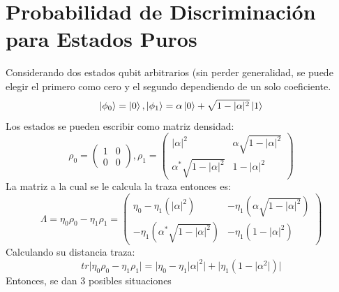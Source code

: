 \documentclass{book}
\begin{document}
\section{{Probabilidad de Discriminación para Estados Puros}}
Considerando dos estados qubit arbitrarios (sin perder generalidad, se puede elegir el primero como cero y el segundo dependiendo de un solo coeficiente.
\begin{equation} {\ket{\phi_0}=\ket{0}, \ket{\phi_1}=\alpha\ket{0}+\sqrt{1-\lvert\alpha\rvert^2}\ket{1} } \end{equation}
Los estados se pueden escribir como matriz densidad:
\begin{equation}{\rho_0=\begin{pmatrix} 1&0\\0&0\end{pmatrix}, \rho_1=\begin{pmatrix}\lvert\alpha\rvert^2&\alpha\sqrt{1-\lvert\alpha\rvert^2}\\ \alpha^*\sqrt{1-\lvert\alpha\rvert^2}&1-\lvert\alpha\rvert^2\end{pmatrix} }\end{equation}
La matriz a la cual se le calcula la traza entonces es:
\begin{equation}{\Lambda=\eta_0\rho_0-\eta_1\rho_1=\begin{pmatrix}\eta_0-\eta_1(\lvert\alpha\rvert^2)& -\eta_1(\alpha\sqrt{1-\lvert\alpha\rvert^2})\\ -\eta_1(\alpha^*\sqrt{1-\lvert\alpha\rvert^2})& -\eta_1(1-\lvert\alpha\rvert^2)\end{pmatrix}}\end{equation}
Calculando su distancia traza:
\begin{equation}{tr\lvert\eta_0\rho_0-\eta_1\rho_1\rvert=\lvert\eta_0-\eta_1\lvert{\alpha}\rvert^2\rvert+\lvert \eta_1 (1-\lvert\alpha^2\rvert) \rvert}\end{equation}
Entonces, se dan 3 posibles situaciones
\end{document}
